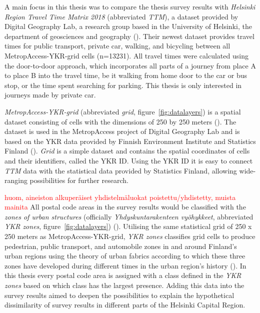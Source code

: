 A main focus in this thesis was to compare the thesis survey results with \textit{Helsinki Region Travel Time Matrix 2018} (abbreviated \textit{TTM}), a dataset provided by Digital Geography Lab, a research group based in the University of Helsinki, the department of geosciences and geography (\cite{Tenkanen2018}). Their newest dataset provides travel times for public transport, private car, walking, and bicycling between all MetropAccess-YKR-grid cells (n=13231). All travel times were calculated using the door-to-door approach, which incorporates all parts of a journey from place A to place B into the travel time, be it walking from home door to the car or bus stop, or the time spent searching for parking. This thesis is only interested in journeys made by private car.

\textit{MetropAccess-YKR-grid} (abbreviated \textit{grid}, figure~\ref{fig:datalayers}) is a spatial dataset consisting of cells with the dimensions of 250 by 250 meters (\cite{Toivonen2014a}). The dataset is used in the MetropAccess project of Digital Geography Lab and is based on the YKR data provided by Finnish Environment Institute and Statistics Finland (\cite{StatisticsFinland2020}). \textit{Grid} is a simple dataset and contains the spatial coordinates of cells and their identifiers, called the YKR ID. Using the YKR ID it is easy to connect \textit{TTM} data with the statistical data provided by Statistics Finland, allowing wide-ranging possibilities for further research.

\textcolor{red}{huom, aineiston alkuperäiset yhdistelmäluokat poistettu/yhdistetty, muista mainita}
All postal code areas in the survey results would be classified with the \textit{zones of urban structures} (officially \textit{Yhdyskuntarakenteen vyöhykkeet}, abbreviated \textit{YKR zones}, figure~\ref{fig:datalayers}) (\cite{Ristimaki2017}). Utilising the same statistical grid of 250 x 250 meters as MetropAccess-YKR-grid, \textit{YKR zones} classifies grid cells to produce pedestrian, public transport, and automobile zones in and around Finland's urban regions using the theory of urban fabrics according to which these three zones have developed during different times in the urban region's history (\cite{Newman2016}). In this thesis every postal code area is assigned with a class defined in the \textit{YKR zones} based on which class has the largest presence. Adding this data into the survey results aimed to deepen the possibilities to explain the hypothetical dissimilarity of survey results in different parts of the Helsinki Capital Region. 

